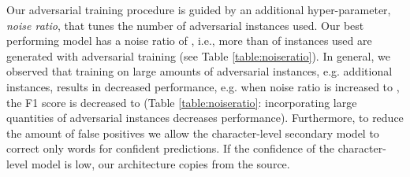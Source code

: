 \documentclass[letterpaper]{article} \usepackage{aaai19}  \usepackage{times}  \usepackage{helvet} \usepackage{courier}  \usepackage[hyphens]{url}  \usepackage{graphicx} \urlstyle{rm} \def\UrlFont{\rm}  \usepackage{graphicx}  \frenchspacing  \setlength{\pdfpagewidth}{8.5in}  \setlength{\pdfpageheight}{11in}
\begin{document}
Our adversarial training procedure is guided by an additional hyper-parameter, \textit{noise ratio}, that tunes the number of adversarial instances used. Our best performing model has a noise ratio of , i.e., more than  of instances used are generated with adversarial training (see Table \ref{table:noiseratio}). In general, we observed that training on large amounts of adversarial instances, e.g.  additional instances, results in decreased performance, e.g. when noise ratio is increased to , the F1 score is decreased to  (Table \ref{table:noiseratio}: incorporating large quantities of adversarial instances decreases performance). Furthermore, to reduce the amount of false positives we allow the character-level secondary model to correct only words for confident predictions. If the confidence of the character-level model is low, our architecture copies from the source.

\begin{table}[h]
\centering
{}
\caption{Best performing hyper-parameter settings of our proposed text normalization models}
\label{params}
\end{table}

\begin{table}
  \centering
      \caption{Comparison of our S2S models with word-level baselines.}
  \label{table:submissions1}
\end{table}
\end{document}
